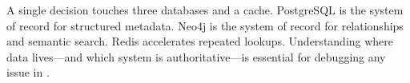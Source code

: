 \begin{keyinsight}
A single decision touches three databases and a cache.  PostgreSQL is the system
of record for structured metadata.  Neo4j is the system of record for
relationships and semantic search.  Redis accelerates repeated lookups.
Understanding where data lives---and which system is authoritative---is essential
for debugging any issue in \sysname{}.
\end{keyinsight}
